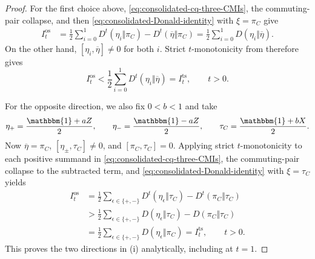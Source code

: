 \documentclass[11pt]{article}
\theoremstyle{remark}
\DeclareMathOperator{\os}{os}
\DeclareMathOperator{\ts}{ts}
\newcommand{\1}{\mathbbm{1}}
\begin{document}
\begin{proof}
For the first choice above, \eqref{eq:consolidated-cq-three-CMIs},
the commuting-pair collapse, and then
\eqref{eq:consolidated-Donald-identity} with $\xi=\pi_C$ give
\begin{equation}
 \begin{aligned}
 I_t^{\os}
 &=\frac12\sum_{i=0}^1D^t(\eta_i\Vert\pi_C)
   -D^t(\overline\eta\Vert\pi_C)=\frac12\sum_{i=0}^1D(\eta_i\Vert\overline\eta).
 \end{aligned}
\end{equation}
On the other hand,
$[\eta_i,\overline\eta]\neq0$ for both $i$.  Strict
$t$-monotonicity from  therefore
gives
\begin{equation}
 I_t^{\os}
 <\frac12\sum_{i=0}^1D^t(\eta_i\Vert\overline\eta)
 =I_t^{\ts},
 \qquad t>0.
 \label{eq:consolidated-os-less-ts}
\end{equation}

For the opposite direction, we also fix $0<b<1$ and take
\begin{equation}
 \eta_+=\frac{\1+aZ}{2},
 \qquad
 \eta_-=\frac{\1-aZ}{2},
 \qquad
 \tau_C=\frac{\1+bX}{2}.
\end{equation}
Now $\overline\eta=\pi_C$,
$[\eta_\pm,\tau_C]\neq0$, and
$[\pi_C,\tau_C]=0$.  Applying
strict $t$-monotonicity to each positive summand in
\eqref{eq:consolidated-cq-three-CMIs}, the commuting-pair collapse
to the subtracted term, and
\eqref{eq:consolidated-Donald-identity} with $\xi=\tau_C$ yields
\begin{equation}
 \begin{aligned}
 I_t^{\os}
 &=\frac12\sum_{\epsilon\in\{+,-\}}
       D^t(\eta_\epsilon\Vert\tau_C)
      -D^t(\pi_C\Vert\tau_C)\\
 &>\frac12\sum_{\epsilon\in\{+,-\}}
        D(\eta_\epsilon\Vert\tau_C)
       -D(\pi_C\Vert\tau_C)\\
 &=\frac12\sum_{\epsilon\in\{+,-\}}
        D(\eta_\epsilon\Vert\pi_C)
 =I_t^{\ts},
 \qquad t>0.
 \end{aligned}
 \label{eq:consolidated-os-greater-ts}
\end{equation}
This proves the two directions in (i) analytically, including at
$t=1$.


\end{proof}
\end{document}
